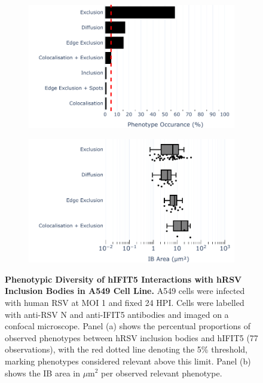 \begin{figure}
    \begin{subfigure}{0.495\textwidth}
        \caption{}
        \includegraphics[width=1\linewidth]{08. Chapter 3/Figs/02. Infection/04. IFIT5/01. bar_i5_a549.pdf} 
    \end{subfigure}
    \begin{subfigure}{0.495\textwidth}
        \caption{}
        \includegraphics[width=1\linewidth]{08. Chapter 3/Figs/02. Infection/04. IFIT5/02. box_i5_a549.pdf}
    \end{subfigure}
    \caption[Phenotypic Diversity of hIFIT5 Interactions with hRSV Inclusion Bodies in A549 Cell Line.]{\textbf{Phenotypic Diversity of hIFIT5 Interactions with hRSV Inclusion Bodies in A549 Cell Line.} A549 cells were infected with human RSV at MOI 1 and fixed 24 HPI. Cells were labelled with anti-RSV N and anti-IFIT5 antibodies and imaged on a confocal microscope. Panel (a) shows the percentual proportions of observed phenotypes between hRSV inclusion bodies and hIFIT5 (77 observations), with the red dotted line denoting the 5\% threshold, marking phenotypes considered relevant above this limit. Panel (b) shows the IB area in \(\mu \mbox{m}^2\) per observed relevant phenotype.}
    \label{fig:Phenotypic Diversity of hIFIT5 Interactions with hRSV Inclusion Bodies in A549 Cell Line}
\end{figure}

